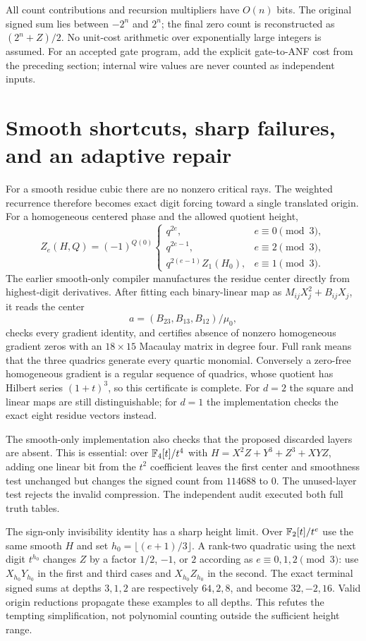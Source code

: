 All count contributions and recursion multipliers have $O(n)$ bits.
The original signed sum lies between $-2^n$ and $2^n$; the final zero
count is reconstructed as $(2^n+Z)/2$. No unit-cost arithmetic over
exponentially large integers is assumed. For an accepted gate program,
add the explicit gate-to-ANF cost from the preceding section; internal
wire values are never counted as independent inputs.

\section{Smooth shortcuts, sharp failures, and an adaptive repair}
For a smooth residue cubic there are no nonzero critical rays. The
weighted recurrence therefore becomes exact digit forcing toward a
single translated origin. For a homogeneous centered phase and the
allowed quotient height,
\[
 Z_e(H,Q)=(-1)^{Q(0)}
 \begin{cases}
 q^{2e},&e\equiv0\pmod3,\\
 q^{2e-1},&e\equiv2\pmod3,\\
 q^{2(e-1)}Z_1(H_0),&e\equiv1\pmod3.
 \end{cases}
\]
The earlier smooth-only compiler manufactures the residue center directly
from highest-digit derivatives. After fitting each binary-linear map as
$M_{ij}X_j^2+B_{ij}X_j$, it reads the center
\[a=(B_{23},B_{13},B_{12})/\mu_0,\]
checks every gradient identity, and
certifies absence of nonzero homogeneous gradient zeros with an
$18\times15$ Macaulay matrix in degree four. Full rank means that the
three quadrics generate every quartic monomial. Conversely a zero-free
homogeneous gradient is a regular sequence of quadrics, whose quotient
has Hilbert series $(1+t)^3$, so this certificate is complete.
For $d=2$ the square and linear maps are still distinguishable; for $d=1$
the implementation checks the exact eight residue vectors instead.

The smooth-only implementation also checks that the proposed discarded
layers are absent. This is essential: over $\mathbb F_4[t]/t^4$ with
$H=X^2Z+Y^3+Z^3+XYZ$, adding one linear bit from the $t^2$ coefficient
leaves the first center and smoothness test unchanged but changes the
signed count from $114688$ to $0$. The unused-layer test rejects the
invalid compression. The independent audit executed both full truth tables.

The sign-only invisibility identity has a sharp height limit. Over
$\mathbb F_2[t]/t^e$ use the same smooth $H$ and set
$h_0=\lfloor(e+1)/3\rfloor$. A rank-two quadratic using the next digit
$t^{h_0}$ changes $Z$ by a factor $1/2$, $-1$, or $2$ according as
$e\equiv0,1,2\pmod3$: use $X_{h_0}Y_{h_0}$ in the first and third
cases and $X_{h_0}Z_{h_0}$ in the second. The exact terminal signed
sums at depths $3,1,2$ are respectively $64,2,8$, and become
$32,-2,16$. Valid origin reductions propagate these examples to all
depths. This refutes the tempting simplification, not polynomial counting
outside the sufficient height range.

